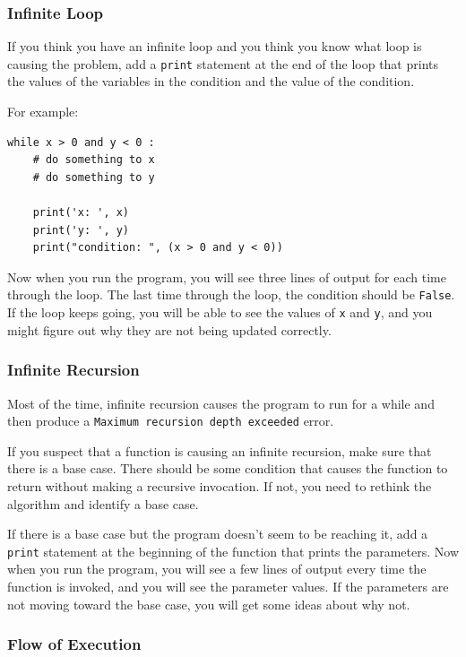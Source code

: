 \subsubsection{Infinite Loop}
  
  

If you think you have an infinite loop and you think you know
what loop is causing the problem, add a {\tt print} statement at
the end of the loop that prints the values of the variables in
the condition and the value of the condition.

For example:

\begin{lstlisting}
while x > 0 and y < 0 :
    # do something to x
    # do something to y

    print('x: ', x)
    print('y: ', y)
    print("condition: ", (x > 0 and y < 0))
\end{lstlisting}
%
Now when you run the program, you will see three lines of output
for each time through the loop.  The last time through the
loop, the condition should be {\tt False}.  If the loop keeps
going, you will be able to see the values of {\tt x} and {\tt y},
and you might figure out why they are not being updated correctly.


\subsubsection{Infinite Recursion}

Most of the time, infinite recursion causes the program to run
for a while and then produce a {\tt Maximum recursion depth exceeded}
error.

If you suspect that a function is causing an infinite
recursion, make sure that there is a base case.
There should be some condition that causes the
function to return without making a recursive invocation.
If not, you need to rethink the algorithm and identify a base
case.

If there is a base case but the program doesn't seem to be reaching
it, add a {\tt print} statement at the beginning of the function
that prints the parameters.  Now when you run the program, you will see
a few lines of output every time the function is invoked,
and you will see the parameter values.  If the parameters are not moving
toward the base case, you will get some ideas about why not.


\subsubsection{Flow of Execution}

